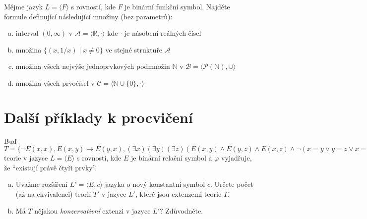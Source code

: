\begin{problem}

    Mějme jazyk $L=\langle F \rangle$ s rovností, kde $F$ je binární funkční symbol. Najděte formule definující následující množiny (bez parametrů):
    \begin{enumerate}[(a)]
        \item interval $(0,\infty)$ v $\mathcal A=\langle\mathbb R, \cdot\rangle$ kde $\cdot$ je násobení reálných čísel
        \item množina $\{(x, 1/x)\mid x\neq 0\}$ ve stejné struktuře $\mathcal A$
        \item množina všech nejvýše jednoprvkových podmnožin $\mathbb N$ v $\mathcal B=\langle\mathcal P(\mathbb N),\cup\rangle$
        \item množina všech prvočísel v $\mathcal C=\langle \mathbb N\cup\{0\}, \cdot\rangle$
    \end{enumerate}

    \begin{solution}
                    
    \end{solution}

\end{problem}
        
        
\section*{Další příklady k procvičení}


\begin{problem}

    Buď $T=\{\neg E(x,x), E(x,y)\to E(y,x), (\exists x)(\exists y)(\exists z)(E(x,y)\wedge E(y,z)\wedge E(x,z)\wedge \neg(x=y\vee y=z\vee x=z)),\varphi\}$ teorie v jazyce $L=\langle E\rangle$ s rovností, kde $E$ je binární relační symbol a $\varphi$ vyjadřuje, že ``existují právě čtyři prvky''.
    \begin{enumerate}[(a)]
        \item Uvažme rozšíření $L'=\langle E,c\rangle$ jazyka o nový konstantní symbol $c$. Určete počet (až na ekvivalenci) teorií $T'$ v jazyce $L'$, které jsou extenzemi teorie $T$. 
        \item Má $T$ nějakou \emph{konzervativní} extenzi v jazyce $L'$? Zdůvodněte.
    \end{enumerate}

\end{problem}


